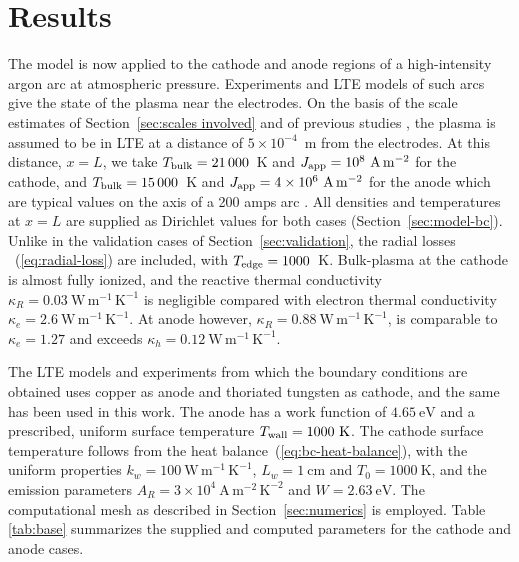\section{Results}
\label{sec:results}

The model is now applied to the cathode and anode regions of a high-intensity argon arc at atmospheric pressure. Experiments and LTE models of such arcs give the state of the plasma near the electrodes. On the basis of the scale estimates of Section~\ref{sec:scales involved} and of previous studies \cite{Almeida2008,DinulescuPfender1980,tashiro2010numerical,semenov2016numerical}, the plasma is assumed to be in LTE at a distance of \(5\times10^{-4}\)~m from the electrodes. At this distance, \(x=L\), we take \(T_{\rm bulk}=21\,000\)~K and \(J_{\rm app}=10^{8}\ \mathrm{A\,m^{-2}}\) for the cathode, and \(T_{\rm bulk}=15\,000\)~K and \(J_{\rm app}=4\times10^{6}\ \mathrm{A\,m^{-2}}\) for the anode which are typical values on the axis of a 200 amps arc \cite{Hsu1983,haddad1984temperature,lago2004numerical,LiangTrelles,korsipati2026fast}. All densities and temperatures at \(x=L\) are supplied as Dirichlet values for both cases (Section~\ref{sec:model-bc}). Unlike in the validation cases of Section~\ref{sec:validation}, the radial losses ~(\ref{eq:radial-loss}) are included, with \(T_{\rm edge}=1000\)~K.  Bulk-plasma at the cathode is almost fully ionized, and the reactive thermal conductivity \(\kappa_R=0.03\ \mathrm{W\,m^{-1}\,K^{-1}}\) is negligible compared with electron thermal conductivity \(\kappa_e=2.6\ \mathrm{W\,m^{-1}\,K^{-1}}\). At anode however, \(\kappa_R=0.88\ \mathrm{W\,m^{-1}\,K^{-1}}\), is comparable to \(\kappa_e=1.27\) and exceeds \(\kappa_h=0.12\ \mathrm{W\,m^{-1}\,K^{-1}}\).

The LTE models and experiments from which the boundary conditions are obtained uses copper as anode and thoriated tungsten as cathode, and the same has been used in this work. The anode has a work function of \(4.65~\mathrm{eV}\) and a prescribed, uniform surface temperature \(T_{\rm wall}=1000~\mathrm{K}\). The cathode surface temperature follows from the heat balance~(\ref{eq:bc-heat-balance}), with the uniform properties \(k_w=100~\mathrm{W\,m^{-1}\,K^{-1}}\), \(L_w=1~\mathrm{cm}\) and \(T_0=1000~\mathrm{K}\), and the emission parameters \(A_R=3\times10^4~\mathrm{A\,m^{-2}\,K^{-2}}\) and \(W=2.63~\mathrm{eV}\). The computational mesh as described in Section~\ref{sec:numerics} is employed. Table \ref{tab:base} summarizes the supplied and computed parameters for the cathode and anode cases.




